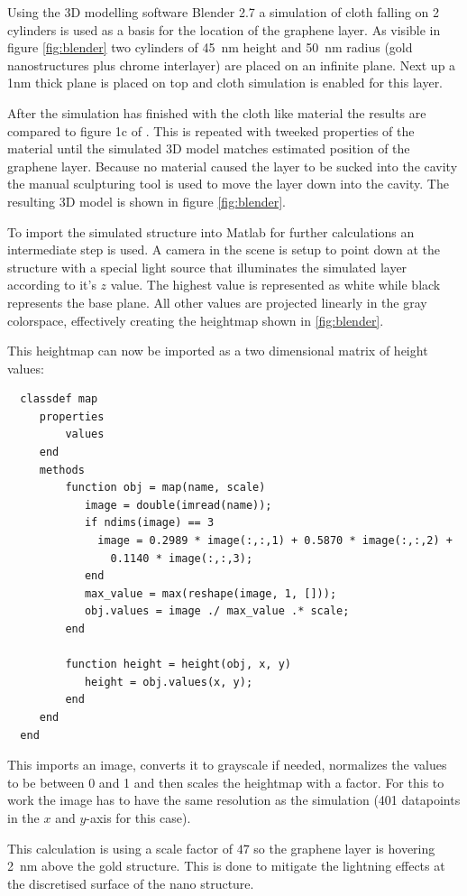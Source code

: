 Using the 3D modelling software Blender 2.7 a simulation of cloth falling on 2 cylinders is used as a basis for the location of the graphene layer. As visible in figure \ref{fig:blender} two cylinders of \SI{45}{nm} height and \SI{50}{nm} radius (gold nanostructures plus chrome interlayer) are placed on an infinite plane. Next up a 1nm thick plane is placed on top and cloth simulation is enabled for this layer.

After the simulation has finished with the cloth like material the results are compared to figure 1c of \cite{heeg}. This is repeated with tweeked properties of the material until the simulated 3D model matches estimated position of the graphene layer. Because no material caused the layer to be sucked into the cavity the manual sculpturing tool is used to move the layer down into the cavity. The resulting 3D model is shown in figure \ref{fig:blender}.

To import the simulated structure into Matlab for further calculations an intermediate step is used. A camera in the scene is setup to point down at the structure with a special light source that illuminates the simulated layer according to it's $z$ value. The highest value is represented as white while black represents the base plane. All other values are projected linearly in the gray colorspace, effectively creating the heightmap shown in \ref{fig:blender}.

This heightmap can now be imported as a two dimensional matrix of height values:
\begin{verbatim}
  classdef map
     properties
         values
     end
     methods
         function obj = map(name, scale)
            image = double(imread(name));
            if ndims(image) == 3
              image = 0.2989 * image(:,:,1) + 0.5870 * image(:,:,2) +
                0.1140 * image(:,:,3);
            end
            max_value = max(reshape(image, 1, []));
            obj.values = image ./ max_value .* scale;
         end

         function height = height(obj, x, y)
            height = obj.values(x, y);
         end
     end
  end
\end{verbatim}

This imports an image, converts it to grayscale if needed, normalizes the values to be between 0 and 1 and then scales the heightmap with a factor. For this to work the image has to have the same resolution as the simulation (401 datapoints in the $x$ and $y$-axis for this case).

This calculation is using a scale factor of $47$ so the graphene layer is hovering \SI{2}{nm} above the gold structure. This is done to mitigate the lightning effects at the discretised surface of the nano structure.
